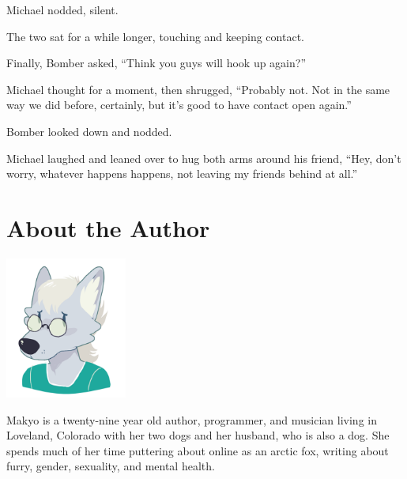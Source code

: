 \documentclass[12pt,letterpaper,oneside]{memoir}
\begin{document}
  Michael nodded, silent.

  The two sat for a while longer, touching and keeping contact.

  Finally, Bomber asked, ``Think you guys will hook up again?''

  Michael thought for a moment, then shrugged, ``Probably not.  Not in the same way we did before, certainly, but it's good to have contact open again.''

  Bomber looked down and nodded.

  Michael laughed and leaned over to hug both arms around his friend, ``Hey, don't worry, whatever happens happens, not leaving my friends behind at all.''

  \chapter*{About the Author}

  \begin{center}
    \includegraphics[width=0.3\textwidth]{roryfrancis--fret--makyo}
  \end{center}

  Makyo is a twenty-nine year old author, programmer, and musician living in Loveland, Colorado with her two dogs and her husband, who is also a dog.  She spends much of her time puttering about online as an arctic fox, writing about furry, gender, sexuality, and mental health.
\end{document}
